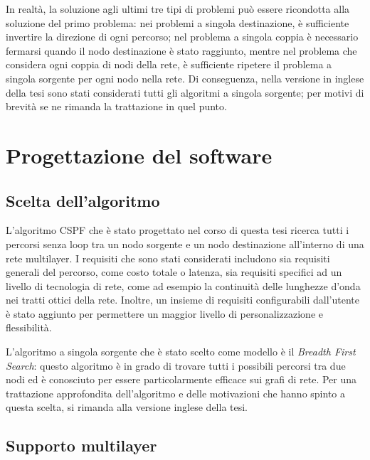 \documentclass[10pt,a4paper]{report}
\begin{document}
In realtà, la soluzione agli ultimi tre tipi di problemi può essere
ricondotta alla soluzione del primo problema: nei problemi a singola
destinazione, è sufficiente invertire la direzione di ogni percorso;
nel problema a singola coppia è necessario fermarsi quando il nodo
destinazione è stato raggiunto, mentre nel problema che considera ogni
coppia di nodi della rete, è sufficiente ripetere il problema a
singola sorgente per ogni nodo nella rete. Di conseguenza, nella
versione in inglese della tesi sono stati considerati tutti gli
algoritmi a singola sorgente; per motivi di brevità se ne rimanda la
trattazione in quel punto.

\newpage

\section*{Progettazione del software}

\subsection*{Scelta dell'algoritmo}

L'algoritmo CSPF che è stato progettato nel corso di questa tesi
ricerca tutti i percorsi senza loop tra un nodo sorgente e un nodo
destinazione all'interno di una rete multilayer. I requisiti che sono
stati considerati includono sia requisiti generali del percorso, come
costo totale o latenza, sia requisiti specifici ad un livello di
tecnologia di rete, come ad esempio la continuità delle lunghezze
d'onda nei tratti ottici della rete. Inoltre, un insieme di requisiti
configurabili dall'utente è stato aggiunto per permettere un maggior
livello di personalizzazione e flessibilità.

L'algoritmo a singola sorgente che è stato scelto come modello è il
\textit{Breadth First Search}: questo algoritmo è in grado di trovare
tutti i possibili percorsi tra due nodi ed è conosciuto per essere
particolarmente efficace sui grafi di rete. Per una trattazione
approfondita dell'algoritmo e delle motivazioni che hanno spinto a
questa scelta, si rimanda alla versione inglese della tesi.

\subsection*{Supporto multilayer}
\end{document}
